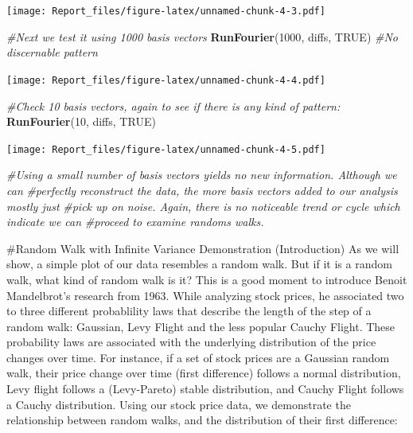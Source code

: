 \documentclass[]{article}
\newenvironment{Shaded}{\begin{snugshade}}{\end{snugshade}}
\newcommand{\CommentTok}[1]{\textcolor[rgb]{0.56,0.35,0.01}{\textit{#1}}}
\newcommand{\DecValTok}[1]{\textcolor[rgb]{0.00,0.00,0.81}{#1}}
\newcommand{\KeywordTok}[1]{\textcolor[rgb]{0.13,0.29,0.53}{\textbf{#1}}}
\newcommand{\NormalTok}[1]{#1}
\newcommand{\OtherTok}[1]{\textcolor[rgb]{0.56,0.35,0.01}{#1}}
\begin{document}
\texttt{[image: Report\_files/figure-latex/unnamed-chunk-4-3.pdf]}

\begin{Shaded}
\begin{Highlighting}[]
\CommentTok{#Next we test it using 1000 basis vectors}
\KeywordTok{RunFourier}\NormalTok{(}\DecValTok{1000}\NormalTok{, diffs, }\OtherTok{TRUE}\NormalTok{) }\CommentTok{#No discernable pattern}
\end{Highlighting}
\end{Shaded}

\texttt{[image: Report\_files/figure-latex/unnamed-chunk-4-4.pdf]}

\begin{Shaded}
\begin{Highlighting}[]
\CommentTok{#Check 10 basis vectors, again to see if there is any kind of pattern:}
\KeywordTok{RunFourier}\NormalTok{(}\DecValTok{10}\NormalTok{, diffs, }\OtherTok{TRUE}\NormalTok{)}
\end{Highlighting}
\end{Shaded}

\texttt{[image: Report\_files/figure-latex/unnamed-chunk-4-5.pdf]}

\begin{Shaded}
\begin{Highlighting}[]
\CommentTok{#Using a small number of basis vectors yields no new information. Although we can}
\CommentTok{#perfectly reconstruct the data, the more basis vectors added to our analysis mostly just}
\CommentTok{#pick up on noise. Again, there is no noticeable trend or cycle which indicate we can}
\CommentTok{#proceed to examine randoms walks.}
\end{Highlighting}
\end{Shaded}

\#Random Walk with Infinite Variance Demonstration (Introduction) As we
will show, a simple plot of our data resembles a random walk. But if it
is a random walk, what kind of random walk is it? This is a good moment
to introduce Benoit Mandelbrot's research from 1963. While analyzing
stock prices, he associated two to three different probablility laws
that describe the length of the step of a random walk: Gaussian, Levy
Flight and the less popular Cauchy Flight. These probability laws are
associated with the underlying distribution of the price changes over
time. For instance, if a set of stock prices are a Gaussian random walk,
their price change over time (first difference) follows a normal
distribution, Levy flight follows a (Levy-Pareto) stable distribution,
and Cauchy Flight follows a Cauchy distribution. Using our stock price
data, we demonstrate the relationship between random walks, and the
distribution of their first difference:
\end{document}
